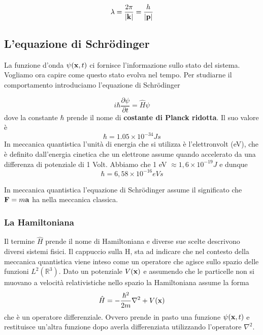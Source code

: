 \begin{equation}
	\lambda = \frac{2\pi}{|\bold{k}|} = \frac{h}{|\bold{p}|}
\end{equation}

\subsection{L'equazione di Schr\"odinger}

La funzione d'onda $\psi(\bold{x},t)$ ci fornisce l'informazione sullo stato del sistema. Vogliamo ora capire come questo stato evolva nel tempo. Per studiarne il comportamento introduciamo l'equazione di Schr\"odinger 

\begin{equation}
	\boxed{i\hbar \frac{\partial \psi}{\partial t} = \hat{H} \psi}
\end{equation}
dove la constante $\hbar$ prende il nome di \textbf{costante di Planck ridotta}. Il suo valore \`e 
\begin{equation*}
	\hbar = 1.05 \times 10^{-34} Js
\end{equation*}
In meccanica quantistica l'unit\`a di energia che si utilizza \`e l'elettronvolt (eV), che \`e definito dall'energia cinetica che un elettrone assume quando accelerato da una differenza di potenziale di 1 Volt. Abbiamo che 1 eV $\approx 1,6 \times 10^{-19} J$ e dunque 
\begin{equation*}
	\hbar = 6,58 \times 10^{-16} eVs  
\end{equation*}

In meccanica quantistica l'equazione di Schr\"odinger assume il significato che $\bold{F} = m\bold{a}$ ha nella meccanica classica.
\subsubsection{La Hamiltoniana}

Il termine $\hat{H}$ prende il nome di Hamiltoniana e diverse sue scelte descrivono diversi sistemi fisici. Il cappuccio sulla H, sta ad indicare che nel contesto della meccanica quantistica viene inteso come un operatore che agisce sullo spazio delle funzioni $L^2(\mathbb{R}^3)$. Dato un potenziale $V(\bold{x})$ e assumendo che le particelle non si muovano a velocit\`a relativistiche nello spazio la Hamiltoniana assume la forma
\begin{equation}
	\hat{H} = -\frac{\hbar^2}{2m}\nabla^2 + V(\bold{x})
\end{equation}
che \`e un operatore differenziale. Ovvero prende in pasto una funzione $\psi(\bold{x},t)$ e restituisce un'altra funzione dopo averla differenziata utilizzando l'operatore $\nabla^2$.

